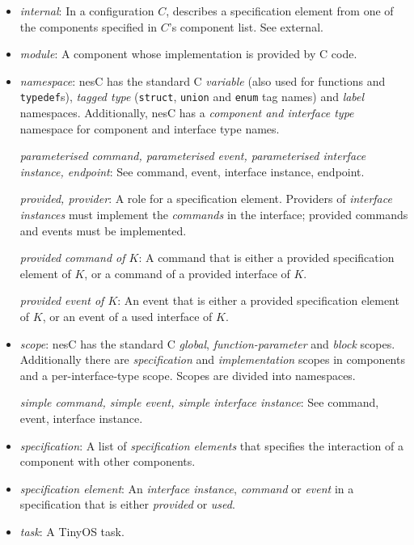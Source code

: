 \documentclass[11pt,letterpaper]{article}
\newcommand{\code}[1]{{\tt #1}}
\newcommand{\nesc}{nesC\xspace}
\newcommand{\tinyos}{TinyOS\xspace}
\begin{document}
\begin{itemize}
\item \emph{internal}: In a configuration $C$, describes a specification
element from one of the components specified in $C$'s component list. See
external.

\item \emph{module}: A component whose implementation is provided by C
code. 

\item \emph{namespace}: \nesc has the standard C \emph{variable} (also
used for functions and \code{typedef}s), \emph{tagged type} (\code{struct},
\code{union} and \code{enum} tag names) and \emph{label}
namespaces. Additionally, \nesc has a \emph{component and interface type}
namespace for component and interface type names.

\emph{parameterised command, parameterised event, parameterised interface
instance, endpoint}: See command, event, interface instance, endpoint.

\emph{provided, provider}: A role for a specification element. Providers of
\emph{interface instances} must implement the \emph{commands} in the
interface; provided commands and events must be implemented.

\emph{provided command of $K$}: A command that is either a
provided specification element of $K$, or a command of a provided interface
of $K$.

\emph{provided event of $K$}: An event that is either a
provided specification element of $K$, or an event of a used interface
of $K$.

\item \emph{scope}: \nesc has the standard C \emph{global},
\emph{function-parameter} and \emph{block} scopes. Additionally there are
\emph{specification} and \emph{implementation} scopes in components and a
per-interface-type scope. Scopes are divided into namespaces.

\emph{simple command, simple event, simple interface instance}: See
command, event, interface instance.

\item \emph{specification}: A list of \emph{specification elements} that
specifies the interaction of a component with other components.

\item \emph{specification element}: An \emph{interface instance},
\emph{command} or \emph{event} in a specification that is either 
\emph{provided} or \emph{used}.

\item \emph{task}: A \tinyos task.


\end{itemize}
\end{document}
